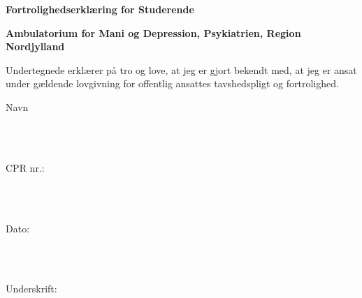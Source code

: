 


\vspace{5cm}

{\centering \Large \textbf{Fortrolighedserklæring for Studerende} \\ \vspace{2cm}}

{\centering \large \textbf{Ambulatorium for Mani og Depression, Psykiatrien, Region Nordjylland} \\ \vspace{2cm}}

\noindent
Undertegnede erklærer på tro og love, at jeg er gjort bekendt med, at jeg er ansat under gældende lovgivning for offentlig ansattes tavshedspligt og fortrolighed.

\vspace{1cm}
\noindent
\vspace{5mm}
\parbox[h]{2cm}{Navn}\hspace{0.5cm} \makebox[7cm]{\hrulefill} \\ \\
\vspace{5mm}
\parbox[h]{2cm}{CPR nr.: }\hspace{0.5cm} \makebox[7cm]{\hrulefill} \\ \\
\vspace{5mm}
\parbox[h]{2cm}{Dato:}\hspace{0.5cm} \makebox[7cm]{\hrulefill} \\ \\
\vspace{5mm}
\parbox[h]{2cm}{Underskrift: }\hspace{0.5cm} \makebox[7cm]{\hrulefill} \\ \\
\vspace{5mm}

